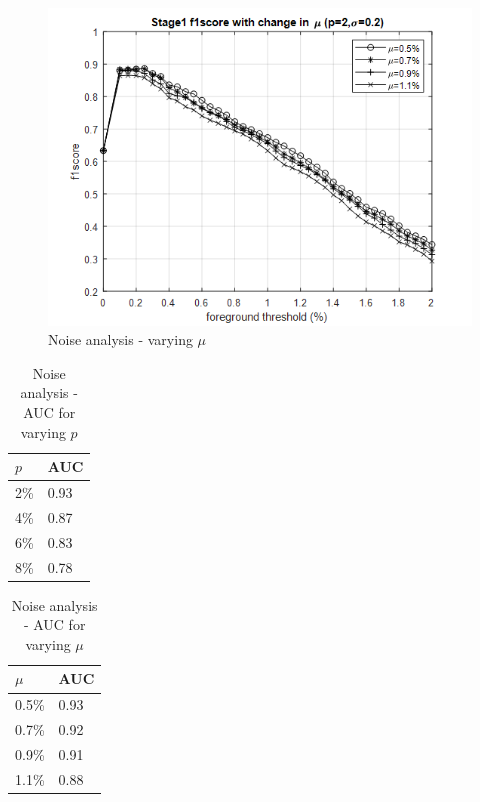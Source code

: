 \begin{figure}
    \centering
    \includegraphics[width=\linewidth]{images/noise-analysis-mog-mu.png}
    \caption{Noise analysis - varying $\mu$}
    \label{fig:noise-analysis-mog-mu}
\end{figure}

\begin{table}
\centering
\caption{Noise analysis - AUC for varying $p$} \vspace{5pt}
\label{table:noise-analysis-auc-mog-p}
\begin{tabular}{|l|l|}
\hline
$p$         & AUC  \\ \hline \hline
2\%         & 0.93   \\
4\%         & 0.87    \\ 
6\%         & 0.83      \\ 
8\%         & 0.78       \\ \hline
\end{tabular}
\end{table}

\begin{table}
\centering
\caption{Noise analysis - AUC for varying $\mu$} \vspace{5pt}
\label{table:noise-analysis-auc-mog-mu}
\begin{tabular}{|l|l|}
\hline
$\mu$         & AUC  \\ \hline \hline
0.5\%         & 0.93   \\
0.7\%         & 0.92    \\ 
0.9\%         & 0.91      \\ 
1.1\%         & 0.88       \\ \hline
\end{tabular}
\end{table}



\newpage